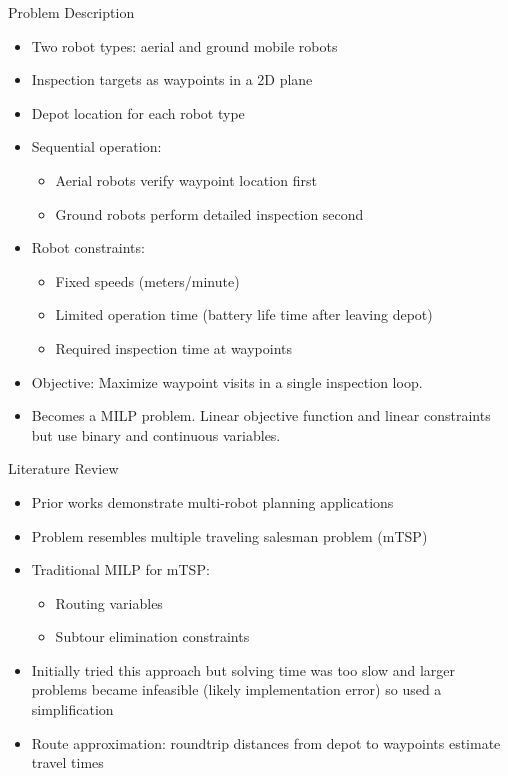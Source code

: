 \documentclass[11pt,xcolor={dvipsnames},hyperref={pdftex,pdfpagemode=UseNone,hidelinks,pdfdisplaydoctitle=true},usepdftitle=false]{beamer}
\begin{document}
    \begin{frame}{Problem Description}
      \begin{itemize}
        \item Two robot types: aerial and ground mobile robots
        \item Inspection targets as waypoints in a 2D plane
        \item Depot location for each robot type
        \item Sequential operation:
          \begin{itemize}
            \item Aerial robots verify waypoint location first
            \item Ground robots perform detailed inspection second
          \end{itemize}
        \item Robot constraints:
          \begin{itemize}
            \item Fixed speeds (meters/minute)
            \item Limited operation time (battery life time after leaving depot)
            \item Required inspection time at waypoints
          \end{itemize}
        \item Objective: Maximize waypoint visits in a single inspection loop. 
        \item Becomes a MILP problem. Linear objective function and linear constraints but use binary and continuous variables. 
      \end{itemize}

    \end{frame}

    \begin{frame}{Literature Review}
      \begin{itemize}
        \item Prior works demonstrate multi-robot planning applications
        \item Problem resembles multiple traveling salesman problem (mTSP)
        \item Traditional MILP for mTSP:
          \begin{itemize}
            \item Routing variables 
            \item Subtour elimination constraints
          \end{itemize}
        \item Initially tried this approach but solving time was too slow and larger problems became infeasible (likely implementation error) so used a simplification
        \item Route approximation: roundtrip distances from depot to waypoints estimate travel times
      \end{itemize}
    \end{frame}
\end{document}
